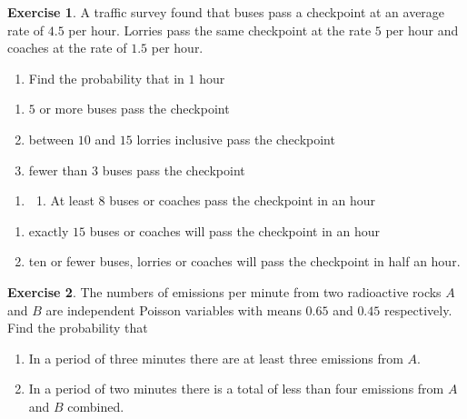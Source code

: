 \documentclass[
]{book}
\providecommand{\tightlist}{%
  \setlength{\itemsep}{0pt}\setlength{\parskip}{0pt}}
\theoremstyle{definition}
\theoremstyle{definition}
\theoremstyle{definition}
\newtheorem{exercise}{Exercise}[chapter]
\theoremstyle{definition}
\theoremstyle{remark}
\begin{document}
\begin{exercise}

A traffic survey found that buses pass a checkpoint at an average rate of \(4.5\) per hour. Lorries pass the same checkpoint at the rate \(5\) per hour and coaches at the rate of \(1.5\) per hour.

\begin{enumerate}
\def\labelenumi{\alph{enumi})}
\tightlist
\item
  Find the probability that in \(1\) hour
\end{enumerate}

\begin{enumerate}
\def\labelenumi{(\roman{enumi})}
\item
  \(5\) or more buses pass the checkpoint
\item
  between \(10\) and \(15\) lorries inclusive pass the checkpoint
\item
  fewer than \(3\) buses pass the checkpoint
\end{enumerate}

\begin{enumerate}
\def\labelenumi{\alph{enumi})}
\setcounter{enumi}{1}
\item
  \begin{enumerate}
  \def\labelenumii{(\roman{enumii})}
  \tightlist
  \item
    At least \(8\) buses or coaches pass the checkpoint in an hour
  \end{enumerate}
\end{enumerate}

\begin{enumerate}
\def\labelenumi{(\roman{enumi})}
\setcounter{enumi}{1}
\item
  exactly \(15\) buses or coaches will pass the checkpoint in an hour
\item
  ten or fewer buses, lorries or coaches will pass the checkpoint in half an hour.
\end{enumerate}

\end{exercise}

\begin{exercise}

The numbers of emissions per minute from two radioactive rocks \(A\) and \(B\) are independent Poisson variables with means \(0.65\) and \(0.45\) respectively. Find the probability that

\begin{enumerate}
\def\labelenumi{(\alph{enumi})}
\item
  In a period of three minutes there are at least three emissions from \(A\).
\item
  In a period of two minutes there is a total of less than four emissions from \(A\) and \(B\) combined.
\end{enumerate}

\end{exercise}
\end{document}
